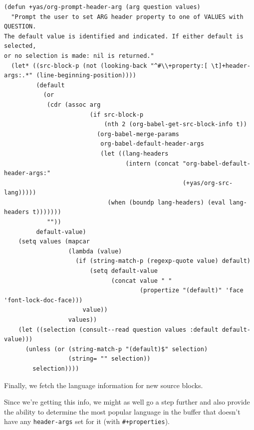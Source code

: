 \documentclass[11pt]{article}
\begin{document}
\begin{verbatim}
(defun +yas/org-prompt-header-arg (arg question values)
  "Prompt the user to set ARG header property to one of VALUES with QUESTION.
The default value is identified and indicated. If either default is selected,
or no selection is made: nil is returned."
  (let* ((src-block-p (not (looking-back "^#\\+property:[ \t]+header-args:.*" (line-beginning-position))))
         (default
           (or
            (cdr (assoc arg
                        (if src-block-p
                            (nth 2 (org-babel-get-src-block-info t))
                          (org-babel-merge-params
                           org-babel-default-header-args
                           (let ((lang-headers
                                  (intern (concat "org-babel-default-header-args:"
                                                  (+yas/org-src-lang)))))
                             (when (boundp lang-headers) (eval lang-headers t)))))))
            ""))
         default-value)
    (setq values (mapcar
                  (lambda (value)
                    (if (string-match-p (regexp-quote value) default)
                        (setq default-value
                              (concat value " "
                                      (propertize "(default)" 'face 'font-lock-doc-face)))
                      value))
                  values))
    (let ((selection (consult--read question values :default default-value)))
      (unless (or (string-match-p "(default)$" selection)
                  (string= "" selection))
        selection))))
\end{verbatim}

Finally, we fetch the language information for new source blocks.

Since we're getting this info, we might as well go a step further and also
provide the ability to determine the most popular language in the buffer that
doesn't have any \texttt{header-args} set for it (with \texttt{\#+properties}).
\end{document}
